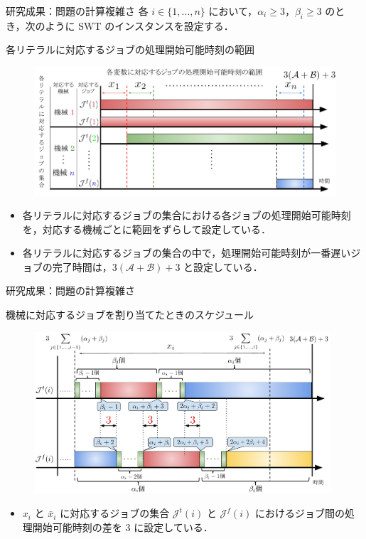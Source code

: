 \documentclass[dvipdfmx]{beamer}
\begin{document}
    \begin{frame}{研究成果：問題の計算複雑さ}
      各 $i \in \{ 1,\ldots,n\}$ において，$\alpha_i \ge 3$，$\beta_i \ge 3$ のとき，次のように SWT のインスタンスを設定する．
      \begin{block}{各リテラルに対応するジョブの処理開始可能時刻の範囲}
        \begin{figure}[h]
          \centering
          \includegraphics[width = 10 cm]{figure/3SAT3.pdf}
        \end{figure}
      \end{block}
      \begin{itemize}
        \item 各リテラルに対応するジョブの集合における各ジョブの処理開始可能時刻を，対応する機械ごとに範囲をずらして設定している．
        \item 各リテラルに対応するジョブの集合の中で，処理開始可能時刻が一番遅いジョブの完了時間は，$3(\mathcal{A} + \mathcal{B}) + 3$ と設定している．
      \end{itemize}
    \end{frame}

    \begin{frame}{研究成果：問題の計算複雑さ}
      \begin{block}{機械に対応するジョブを割り当てたときのスケジュール}
        \begin{figure}[h]
          \centering
          \includegraphics[width = 11cm]{figure/3SAT4.pdf}
        \end{figure}
      \end{block}
      \begin{itemize}
        \item $x_i$ と $\bar x_i$ に対応するジョブの集合 $\mathcal{J}^t(i)$ と $\mathcal{J}^f(i)$ におけるジョブ間の処理開始可能時刻の差を $3$ に設定している．
      \end{itemize}
    \end{frame}
\end{document}
